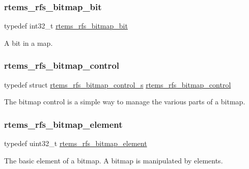\subsubsection{\texorpdfstring{rtems\_rfs\_bitmap\_bit}{rtems\_rfs\_bitmap\_bit}}
{\footnotesize\ttfamily typedef int32\+\_\+t \mbox{\hyperlink{rtems-rfs-bitmaps_8h_acc1b0aefe1b090890ccbc1b05279a78e}{rtems\+\_\+rfs\+\_\+bitmap\+\_\+bit}}}

A bit in a map. \mbox{\label{rtems-rfs-bitmaps_8h_aa1b1de5abc294444428eb1038d7f898b}} 
\subsubsection{\texorpdfstring{rtems\_rfs\_bitmap\_control}{rtems\_rfs\_bitmap\_control}}
{\footnotesize\ttfamily typedef struct \mbox{\hyperlink{structrtems__rfs__bitmap__control__s}{rtems\+\_\+rfs\+\_\+bitmap\+\_\+control\+\_\+s}}  \mbox{\hyperlink{rtems-rfs-bitmaps_8h_aa1b1de5abc294444428eb1038d7f898b}{rtems\+\_\+rfs\+\_\+bitmap\+\_\+control}}}

The bitmap control is a simple way to manage the various parts of a bitmap. \mbox{\label{rtems-rfs-bitmaps_8h_a2e909e0a0c9759ac71ca69851253b905}} 
\subsubsection{\texorpdfstring{rtems\_rfs\_bitmap\_element}{rtems\_rfs\_bitmap\_element}}
{\footnotesize\ttfamily typedef uint32\+\_\+t \mbox{\hyperlink{rtems-rfs-bitmaps_8h_a2e909e0a0c9759ac71ca69851253b905}{rtems\+\_\+rfs\+\_\+bitmap\+\_\+element}}}

The basic element of a bitmap. A bitmap is manipulated by elements. \mbox{\label{rtems-rfs-bitmaps_8h_ad7417fa816b1cfccbc03fc564a5b341b}} 
